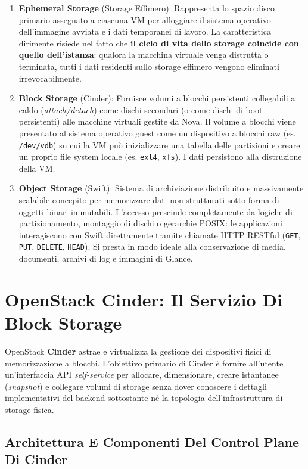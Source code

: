 \documentclass[11pt, a4paper]{article}
\begin{document}
\begin{enumerate}
    \item \textbf{Ephemeral Storage} (Storage Effimero):
    Rappresenta lo spazio disco primario assegnato a ciascuna VM per alloggiare il sistema operativo dell'immagine avviata e i dati temporanei di lavoro. La caratteristica dirimente risiede nel fatto che \textbf{il ciclo di vita dello storage coincide con quello dell'istanza}: qualora la macchina virtuale venga distrutta o terminata, tutti i dati residenti sullo storage effimero vengono eliminati irrevocabilmente.
    \item \textbf{Block Storage} (Cinder):
    Fornisce volumi a blocchi persistenti collegabili a caldo (\emph{attach/detach}) come dischi secondari (o come dischi di boot persistenti) alle macchine virtuali gestite da Nova. Il volume a blocchi viene presentato al sistema operativo guest come un dispositivo a blocchi raw (es. \texttt{/dev/vdb}) su cui la VM può inizializzare una tabella delle partizioni e creare un proprio file system locale (es. \texttt{ext4}, \texttt{xfs}). I dati persistono alla distruzione della VM.
    \item \textbf{Object Storage} (Swift):
    Sistema di archiviazione distribuito e massivamente scalabile concepito per memorizzare dati non strutturati sotto forma di oggetti binari immutabili. L'accesso prescinde completamente da logiche di partizionamento, montaggio di dischi o gerarchie POSIX: le applicazioni interagiscono con Swift direttamente tramite chiamate HTTP RESTful (\texttt{GET}, \texttt{PUT}, \texttt{DELETE}, \texttt{HEAD}). Si presta in modo ideale alla conservazione di media, documenti, archivi di log e immagini di Glance.
\end{enumerate}

\newpage

\section{OpenStack Cinder: Il Servizio Di Block Storage}

OpenStack \textbf{Cinder} astrae e virtualizza la gestione dei dispositivi fisici di memorizzazione a blocchi. L'obiettivo primario di Cinder è fornire all'utente un'interfaccia API \emph{self-service} per allocare, dimensionare, creare istantanee (\emph{snapshot}) e collegare volumi di storage senza dover conoscere i dettagli implementativi del backend sottostante né la topologia dell'infrastruttura di storage fisica.

\subsection{Architettura E Componenti Del Control Plane Di Cinder}
\end{document}
